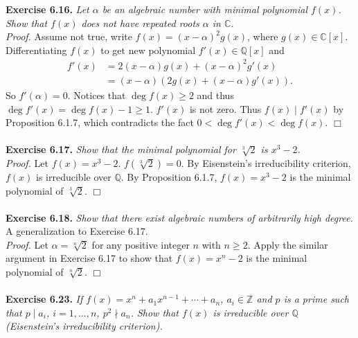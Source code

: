 \documentclass{article}
\begin{document}
\textbf{Exercise 6.16.}
\emph{Let $\alpha$ be an algebraic number with minimal polynomial $f(x)$.
Show that $f(x)$ does not have repeated roots $\alpha$ in $\mathbb{C}$.} \\

\emph{Proof.}
Assume not true, write $f(x) = (x - \alpha)^2 g(x)$,
where $g(x) \in \mathbb{C}[x]$.
Differentiating $f(x)$ to get new polynomial $f'(x) \in \mathbb{Q}[x]$ and
\begin{align*}
f'(x)
&= 2(x - \alpha) g(x) + (x - \alpha)^2 g'(x) \\
&= (x - \alpha)(2 g(x) + (x - \alpha) g'(x)).
\end{align*}
So $f'(\alpha) = 0$.
Notices that $\deg f(x) \geq 2$ and thus $\deg f'(x) = \deg f(x) - 1 \geq 1$.
$f'(x)$ is not zero. Thus $f(x) \mid f'(x)$ by Proposition 6.1.7, which
contradicts the fact $0 < \deg f'(x) < \deg f(x)$.
$\Box$ \\\\



\textbf{Exercise 6.17.}
\emph{Show that the minimal polynomial for $\sqrt[3]{2}$ is $x^3 - 2$.} \\

\emph{Proof.}
Let $f(x) = x^3 - 2$. $f(\sqrt[3]{2}) = 0$.
By Eisenstein's irreducibility criterion, $f(x)$ is irreducible over $\mathbb{Q}$.
By Proposition 6.1.7, $f(x) = x^3 - 2$ is the minimal polynomial of $\sqrt[3]{2}$.
$\Box$ \\\\



\textbf{Exercise 6.18.}
\emph{Show that there exist algebraic numbers of arbitrarily high degree.} \\

A generalization to Exercise 6.17. \\

\emph{Proof.}
Let $\alpha = \sqrt[n]{2}$ for any positive integer $n$ with $n \geq 2$.
Apply the similar argument in Exercise 6.17 to show that
$f(x) = x^n - 2$ is the minimal polynomial of $\sqrt[n]{2}$.
$\Box$ \\\\



\textbf{Exercise 6.23.}
\emph{If $f(x) = x^n + a_1 x^{n-1} + \cdots + a_n$, $a_i \in \mathbb{Z}$
and $p$ is a prime such that $p \mid a_i$, $i = 1, ..., n$, $p^2 \nmid a_n$.
Show that $f(x)$ is irreducible over $\mathbb{Q}$
(Eisenstein's irreducibility criterion).} \\
\end{document}
